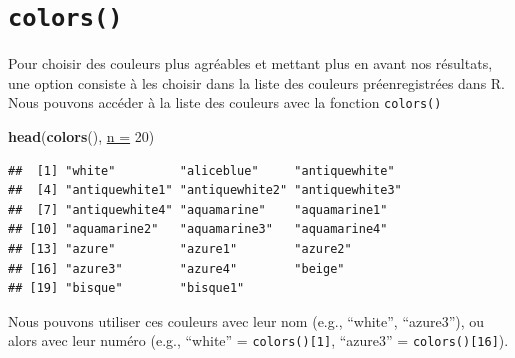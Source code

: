\documentclass[twoside,symmetric]{book}
\newenvironment{Shaded}{}{}
\newcommand{\DataTypeTok}[1]{\underline{#1}}
\newcommand{\DecValTok}[1]{#1}
\newcommand{\KeywordTok}[1]{\textbf{#1}}
\newcommand{\NormalTok}[1]{#1}
\begin{document}
\hypertarget{colors}{%
\section{\texorpdfstring{\texttt{colors()}}{colors()}}\label{colors}}

Pour choisir des couleurs plus agréables et mettant plus en avant nos résultats, une option consiste à les choisir dans la liste des couleurs préenregistrées dans R. Nous pouvons accéder à la liste des couleurs avec la fonction \texttt{colors()}

\begin{Shaded}
\begin{Highlighting}[]
\KeywordTok{head}\NormalTok{(}\KeywordTok{colors}\NormalTok{(), }\DataTypeTok{n =} \DecValTok{20}\NormalTok{)}
\end{Highlighting}
\end{Shaded}

\begin{verbatim}
##  [1] "white"         "aliceblue"     "antiquewhite" 
##  [4] "antiquewhite1" "antiquewhite2" "antiquewhite3"
##  [7] "antiquewhite4" "aquamarine"    "aquamarine1"  
## [10] "aquamarine2"   "aquamarine3"   "aquamarine4"  
## [13] "azure"         "azure1"        "azure2"       
## [16] "azure3"        "azure4"        "beige"        
## [19] "bisque"        "bisque1"
\end{verbatim}

Nous pouvons utiliser ces couleurs avec leur nom (e.g., ``white'', ``azure3''), ou alors avec leur numéro (e.g., ``white'' = \texttt{colors(){[}1{]}}, ``azure3'' = \texttt{colors(){[}16{]}}).
\end{document}
